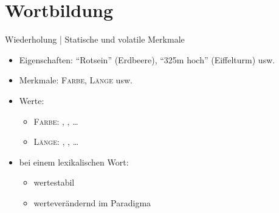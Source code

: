 \section{Wortbildung}

\begin{frame}
  {Wiederholung | Statische und volatile Merkmale}
  \onslide<+->
  \begin{itemize}[<+->]
    \item Eigenschaften: "`Rotsein"' (Erdbeere), "`325m hoch"' (Eiffelturm) usw.
    \item Merkmale: \alert{\textsc{Farbe}}, \alert{\textsc{Länge}} usw.
    \item Werte:
      \begin{itemize}[<+->]
        \item \alert{\textsc{Farbe}}: , , \ldots
        \item \alert{\textsc{Länge}}: \rot{\textit{3cm}}, , \ldots
      \end{itemize}
  \end{itemize}
  \onslide<+->
  \Halbzeile 
  \begin{exe}
    \ex
    \begin{xlist}
      \onslide<+->
      \onslide<+->
    \end{xlist}
  \end{exe}
  \Halbzeile
  \begin{itemize}[<+->]
    \item bei einem lexikalischen Wort:
      \begin{itemize}
        \item {} wertestabil
        \item {} werteverändernd im Paradigma
      \end{itemize}
  \end{itemize}
\end{frame}

